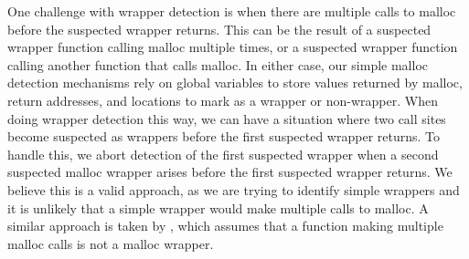 \documentclass[conference]{IEEEtran}
\begin{document}
One challenge with wrapper detection is when there are multiple calls to malloc before 
the suspected wrapper returns. This can be the result of a suspected wrapper function 
calling malloc multiple times, or a suspected wrapper function calling another function 
that calls malloc. In either case, our simple malloc detection mechanisms rely on 
global variables to store values returned by malloc, return addresses, and locations to 
mark as a wrapper or non-wrapper. When doing wrapper detection this way, we can have a 
situation where two call sites become suspected as wrappers before the first suspected 
wrapper returns. To handle this, we abort detection of the first suspected wrapper when 
a second suspected malloc wrapper arises before the first suspected wrapper returns. We 
believe this is a valid approach, as we are trying to identify simple wrappers and it 
is unlikely that a simple wrapper would make multiple calls to malloc. A similar 
approach is taken by \cite{b1}, which assumes that a function making multiple malloc 
calls is not a malloc wrapper.
\end{document}
